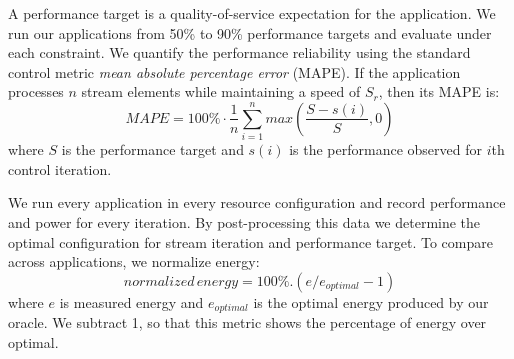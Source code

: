 A performance target is a quality-of-service expectation for the
application. We run our applications from 50\% to 90\% performance
targets and evaluate \SYSTEM{} under each constraint. We quantify the
performance reliability using the standard control metric \emph{mean
  absolute percentage error} (MAPE).  If the application processes $n$
stream elements while maintaining a speed of $S_r$, then its MAPE is:
\begin{equation}
MAPE = 100\% \cdot \frac{1}{n} \sum\limits_{i=1}^{n} max \left( \frac{S - s(i)}{S},0 \right)
\end{equation}
where $S$ is the performance target and $s(i)$ is the performance
observed for $i$th control iteration.


We run every application in every resource configuration and record
performance and power for every iteration.  By post-processing this
data we determine the optimal configuration for stream iteration and
performance target. To compare across applications, we normalize
energy:
\begin{equation}
  normalized\,energy = 100\% . (e / e_{optimal} - 1)
\end{equation}
where $e$ is measured energy and $e_{optimal}$ is the optimal energy
produced by our oracle. We subtract 1, so that this metric shows the
percentage of energy over optimal.  




